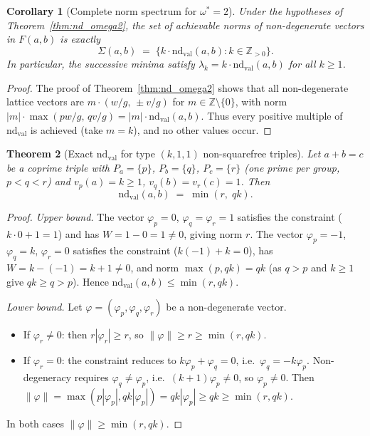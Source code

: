 \documentclass[12pt]{article}
\newtheorem{theorem}{Theorem}
\newtheorem{corollary}[theorem]{Corollary}
\theoremstyle{definition}
\begin{document}
\begin{corollary}[Complete norm spectrum for $\omega^*=2$]\label{cor:nd_omega2_spectrum}
  Under the hypotheses of Theorem~\ref{thm:nd_omega2}, the set of achievable norms of
  non-degenerate vectors in $F(a,b)$ is exactly
  \[
    \Sigma(a,b) \;=\; \{k \cdot \mathrm{nd}_{\mathrm{val}}(a,b) : k \in \mathbb{Z}_{>0}\}.
  \]
  In particular, the successive minima satisfy $\lambda_k = k \cdot \mathrm{nd}_{\mathrm{val}}(a,b)$
  for all $k \ge 1$.
\end{corollary}

\begin{proof}
  The proof of Theorem~\ref{thm:nd_omega2} shows that all non-degenerate lattice vectors
  are $m \cdot (w/g,\, \pm v/g)$ for $m \in \mathbb{Z} \setminus \{0\}$, with norm
  $|m| \cdot \max(p w/g,\, q v/g) = |m| \cdot \mathrm{nd}_{\mathrm{val}}(a,b)$.
  Thus every positive multiple of $\mathrm{nd}_{\mathrm{val}}$ is achieved (take $m = k$), and no other
  values occur.
\end{proof}

\begin{theorem}[Exact $\mathrm{nd}_{\mathrm{val}}$ for type $(k,1,1)$ non-squarefree triples]\label{thm:nd_k11}
  Let $a + b = c$ be a coprime triple with $P_a = \{p\}$, $P_b = \{q\}$, $P_c = \{r\}$
  (one prime per group, $p < q < r$) and $v_p(a) = k \ge 1$, $v_q(b) = v_r(c) = 1$.
  Then
  \[
    \mathrm{nd}_{\mathrm{val}}(a,b) \;=\; \min(r,\; qk).
  \]
\end{theorem}

\begin{proof}
  \textit{Upper bound.}
  The vector $\varphi_p = 0$, $\varphi_q = \varphi_r = 1$ satisfies the constraint
  ($k \cdot 0 + 1 = 1$) and has $W = 1 - 0 = 1 \ne 0$, giving norm $r$.
  The vector $\varphi_p = -1$, $\varphi_q = k$, $\varphi_r = 0$ satisfies the constraint
  ($k(-1) + k = 0$), has $W = k - (-1) = k+1 \ne 0$, and norm $\max(p, qk) = qk$
  (as $q > p$ and $k \ge 1$ give $qk \ge q > p$).
  Hence $\mathrm{nd}_{\mathrm{val}}(a,b) \le \min(r, qk)$.

  \textit{Lower bound.}
  Let $\varphi = (\varphi_p, \varphi_q, \varphi_r)$ be a non-degenerate vector.
  \begin{itemize}
    \item If $\varphi_r \ne 0$: then $r |\varphi_r| \ge r$, so $\|\varphi\| \ge r \ge \min(r, qk)$.
    \item If $\varphi_r = 0$: the constraint reduces to $k\varphi_p + \varphi_q = 0$, i.e.\
      $\varphi_q = -k\varphi_p$.  Non-degeneracy requires $\varphi_q \ne \varphi_p$,
      i.e.\ $(k+1)\varphi_p \ne 0$, so $\varphi_p \ne 0$.
      Then $\|\varphi\| = \max(p|\varphi_p|, qk|\varphi_p|) = qk|\varphi_p| \ge qk \ge \min(r,qk)$.
  \end{itemize}
  In both cases $\|\varphi\| \ge \min(r, qk)$.
\end{proof}
\end{document}
